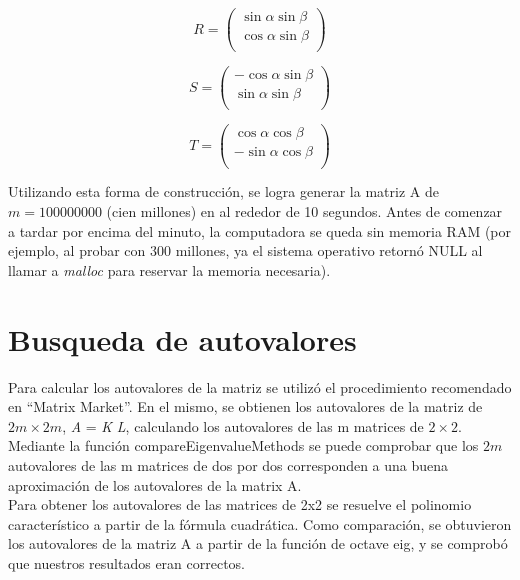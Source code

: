 \documentclass[a4paper,11pt]{article}
\begin{document}
\begin{equation} \label{matrizR}
R =
\left( \begin{array}{cccc}
\sin \alpha \sin \beta\\
\cos \alpha \sin \beta\\
\end{array} \right)
\end{equation}

\begin{equation} \label{matrizS}
S =
\left( \begin{array}{cccc}
-\cos \alpha \sin \beta\\
\sin \alpha \sin \beta\\
\end{array} \right)
\end{equation}

\begin{equation} \label{matrizT}
T =
\left( \begin{array}{cccc}
\cos \alpha \cos \beta\\
-\sin \alpha \cos \beta\\
\end{array} \right)
\end{equation}

Utilizando esta forma de construcción, se logra generar la matriz A de $m =
100000000$ (cien millones) en al rededor de 10 segundos. Antes de comenzar a
tardar por encima del minuto, la computadora se queda sin memoria RAM (por ejemplo,
al probar con 300 millones, ya el sistema operativo retorn\'o NULL al llamar
a \emph{malloc} para reservar la memoria necesaria).

\newpage
\section{Busqueda de autovalores}
Para calcular los autovalores de la matriz se utilizó el procedimiento
recomendado en ``Matrix Market''. En el mismo, se obtienen los autovalores de la
matriz de $2m \times 2m$, \emph{A} = \emph{K} \emph{L}, calculando los autovalores de las m matrices de
$2 \times 2$. \\

Mediante la función compareEigenvalueMethods se puede comprobar que los $2m$
autovalores de las m matrices de dos por dos corresponden a una buena
aproximación de los autovalores de la matrix A. \\

Para obtener los autovalores de las matrices de 2x2 se resuelve el polinomio
característico a partir de la fórmula cuadrática. Como comparación, se
obtuvieron los autovalores de la matriz A a partir de la función de octave eig,
y se comprobó que nuestros resultados eran correctos.\\
\end{document}
